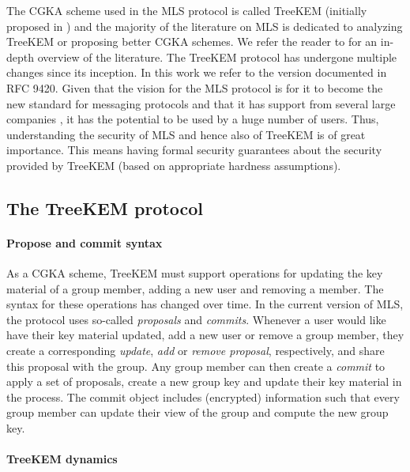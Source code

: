 The CGKA scheme used in the MLS protocol is called TreeKEM (initially proposed in \cite{treekem}) and the majority of the literature on MLS is dedicated to analyzing TreeKEM or proposing better CGKA schemes. We refer the reader to \cite[Section 1.3]{guillermo-thesis} for an in-depth overview of the literature. The TreeKEM protocol has undergone multiple changes since its inception. In this work we refer to the version documented in RFC 9420. Given that the vision for the MLS protocol is for it to become the new standard for messaging protocols and that it has support from several large companies \cite{google-mls,mls-support}, it has the potential to be used by a huge number of users. Thus, understanding the security of MLS and hence also of TreeKEM is of great importance. This means having formal security guarantees about the security provided by TreeKEM (based on appropriate hardness assumptions).

\subsection{The TreeKEM protocol} \label{sec:treekem-overview}

\paragraph{Propose and commit syntax}

As a CGKA scheme, TreeKEM must support operations for updating the key material of a group member, adding a new user and removing a member. The syntax for these operations has changed over time. In the current version of MLS, the protocol uses so-called \emph{proposals} and \emph{commits}. Whenever a user would like have their key material updated, add a new user or remove a group member, they create a corresponding \emph{update}, \emph{add} or \emph{remove proposal}, respectively, and share this proposal with the group. Any group member can then create a \emph{commit} to apply a set of proposals, create a new group key and update their key material in the process. The commit object includes (encrypted) information such that every group member can update their view of the group and compute the new group key.

\paragraph{TreeKEM dynamics}

